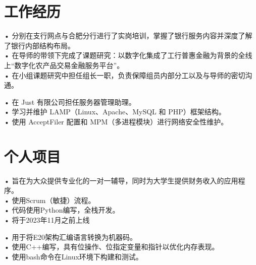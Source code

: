 \documentclass[]{deedy-resume-openfont}
\begin{document}
\hfill
\begin{minipage}[t]{0.66\textwidth} 



\section{工作经历}

\vspace{\topsep} %
• 分别在支行网点与合肥分行进行了实岗培训，掌握了银行服务内容并深度了解了银行内部结构布局。\\
• 在导师的带领下完成了课题研究：以数字化集成了工行普惠金融为背景的全线上“数字化农产品交易金融服务平台”。\\
• 在小组课题研究中担任组长一职，负责保障组员内部分工以及与导师的密切沟通。\\
\sectionsep

\vspace{\topsep} %
• 在 Just 有限公司担任服务器管理助理。\\
• 学习并维护 LAMP（Linux、Apache、MySQL 和 PHP）框架结构。\\
• 使用 AcceptFiler 配置和 MPM（多进程模块）进行网络安全性维护。\\
\sectionsep

\sectionsep

\section{个人项目}
• 旨在为大众提供专业化的一对一辅导，同时为大学生提供财务收入的应用程序。\\
• 使用Scrum（敏捷）流程。\\
• 代码使用Python编写，全栈开发。\\
• 将于2023年11月之前上线\\
\sectionsep

• 用于将E20架构汇编语言转换为机器码。\\
• 使用C++编写，具有位操作、位指定变量和指针以优化内存表现。\\
• 使用bash命令在Linux环境下构建和测试。\\
\sectionsep


\end{minipage}
\end{document}
